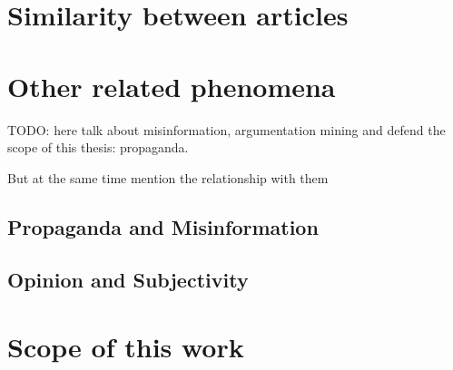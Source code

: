 






\section{Similarity between articles}
\label{sec:lit_relationships}

\section{Other related phenomena}

TODO: here talk about misinformation, argumentation mining and defend the scope of this thesis: propaganda.

But at the same time mention the relationship with them

\subsection{Propaganda and Misinformation}

\subsection{Opinion and Subjectivity}

\section{Scope of this work}
